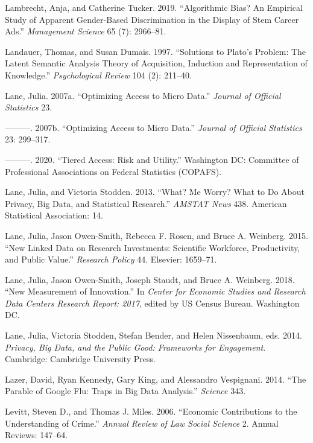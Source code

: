 \documentclass[]{krantz}
\begin{document}
\hypertarget{ref-lambrecht2019}{}
Lambrecht, Anja, and Catherine Tucker. 2019. ``Algorithmic Bias? An
Empirical Study of Apparent Gender-Based Discrimination in the Display
of Stem Career Ads.'' \emph{Management Science} 65 (7): 2966--81.

\hypertarget{ref-landauer-97}{}
Landauer, Thomas, and Susan Dumais. 1997. ``Solutions to Plato's
Problem: The Latent Semantic Analysis Theory of Acquisition, Induction
and Representation of Knowledge.'' \emph{Psychological Review} 104 (2):
211--40.

\hypertarget{ref-Lane2007a}{}
Lane, Julia. 2007a. ``Optimizing Access to Micro Data.'' \emph{Journal
of Official Statistics} 23.

\hypertarget{ref-Lane2007}{}
---------. 2007b. ``Optimizing Access to Micro Data.'' \emph{Journal of
Official Statistics} 23: 299--317.

\hypertarget{ref-Lane2020}{}
---------. 2020. ``Tiered Access: Risk and Utility.'' Washington DC:
Committee of Professional Associations on Federal Statistics (COPAFS).

\hypertarget{ref-lane2013me}{}
Lane, Julia, and Victoria Stodden. 2013. ``What? Me Worry? What to Do
About Privacy, Big Data, and Statistical Research.'' \emph{AMSTAT News}
438. American Statistical Association: 14.

\hypertarget{ref-lane2015new}{}
Lane, Julia, Jason Owen-Smith, Rebecca F. Rosen, and Bruce A. Weinberg.
2015. ``New Linked Data on Research Investments: Scientific Workforce,
Productivity, and Public Value.'' \emph{Research Policy} 44. Elsevier:
1659--71.

\hypertarget{ref-Lane2018}{}
Lane, Julia, Jason Owen-Smith, Joseph Staudt, and Bruce A. Weinberg.
2018. ``New Measurement of Innovation.'' In \emph{Center for Economic
Studies and Research Data Centers Research Report: 2017}, edited by US
Census Bureau. Washington DC.

\hypertarget{ref-lane2014}{}
Lane, Julia, Victoria Stodden, Stefan Bender, and Helen Nissenbaum, eds.
2014. \emph{Privacy, Big Data, and the Public Good: Frameworks for
Engagement}. Cambridge: Cambridge University Press.

\hypertarget{ref-lazer2014parable}{}
Lazer, David, Ryan Kennedy, Gary King, and Alessandro Vespignani. 2014.
``The Parable of Google Flu: Traps in Big Data Analysis.''
\emph{Science} 343.

\hypertarget{ref-levitt2006economic}{}
Levitt, Steven D., and Thomas J. Miles. 2006. ``Economic Contributions
to the Understanding of Crime.'' \emph{Annual Review of Law Social
Science} 2. Annual Reviews: 147--64.
\end{document}

